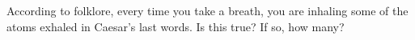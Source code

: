  According to folklore, every time you take a breath, you
are inhaling some of the atoms exhaled in Caesar's
last words. Is this true? If so, how many?
